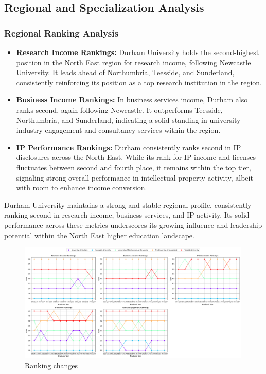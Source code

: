 \documentclass[journal,onecolumn, 10pt,draftclsnofoot]{IEEEtran}
\begin{document}
\subsection{Regional and Specialization Analysis}

\subsubsection{Regional Ranking Analysis}

\begin{itemize}
    \item \textbf{Research Income Rankings:} Durham University holds the second-highest position in the North East region for research income, following Newcastle University. It leads ahead of Northumbria, Teesside, and Sunderland, consistently reinforcing its position as a top research institution in the region.
    
    \item \textbf{Business Income Rankings:} In business services income, Durham also ranks second, again following Newcastle. It outperforms Teesside, Northumbria, and Sunderland, indicating a solid standing in university-industry engagement and consultancy services within the region.
    
    \item \textbf{IP Performance Rankings:} Durham consistently ranks second in IP disclosures across the North East. While its rank for IP income and licenses fluctuates between second and fourth place, it remains within the top tier, signaling strong overall performance in intellectual property activity, albeit with room to enhance income conversion.
\end{itemize}

Durham University maintains a strong and stable regional profile, consistently ranking second in research income, business services, and IP activity. Its solid performance across these metrics underscores its growing influence and leadership potential within the North East higher education landscape.



\begin{figure}[h]
\centering
\includegraphics[width=0.99\textwidth]{Fig/figure35.ranking_changes.png}
\caption{Ranking changes}
\label{fig:ranking-changes}
\end{figure}
\end{document}
